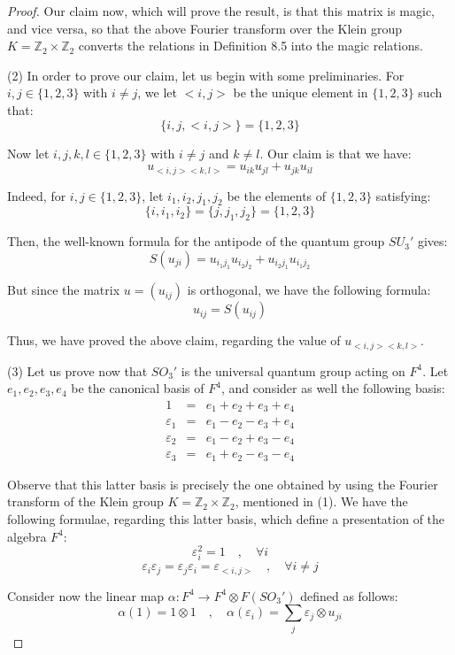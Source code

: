 \documentclass[12pt]{amsbook}
\begin{document}
\begin{proof}
Our claim now, which will prove the result, is that this matrix is magic, and vice versa, so that the above Fourier transform over the Klein group $K=\mathbb Z_2\times\mathbb Z_2$ converts the relations in Definition 8.5 into the magic relations.

\medskip

(2) In order to prove our claim, let us begin with some preliminaries. For $i,j\in\{1,2,3\}$
with $i\neq j$, we let $<i,j>$ be the unique  element in $\{1,2,3\}$ such that:
$$\{i,j,<i,j>\}=\{1,2,3\}$$

Now let $i,j,k,l \in \{1,2,3\}$ with $i\neq j$ and $k\neq l$. Our claim is that we have:
$$u_{<i,j><k,l>}=u_{ik}u_{jl}+u_{jk}u_{il}$$  

Indeed, for $i,j\in\{1,2,3\}$, let $i_1,i_2,j_1,j_2$ be the elements of $\{1,2,3\}$ satisfying:
$$\{i,i_1,i_2\}=\{j,j_1,j_2\}=\{1,2,3\} $$

Then, the well-known formula for the antipode of the quantum group $SU_3'$ gives:
$$S(u_{ji})=u_{i_1j_1}u_{i_2j_2}+u_{i_2j_1}u_{i_1j_2}$$

But since the matrix $u=(u_{ij})$ is orthogonal, we have the following formula:
$$u_{ij}=S(u_{ij})$$

Thus, we have proved the above claim, regarding the value of $u_{<i,j><k,l>}$.  

\medskip

(3) Let us prove now that $SO_3'$ is the universal quantum group acting on $F^4$. Let $e_1, e_2, e_3, e_4$ be the canonical basis of $F^4$, and consider as well the following basis:
\begin{eqnarray*}
1&=&e_1+e_2+e_3+e_4\\
\varepsilon_1&=&e_1-e_2-e_3+e_4\\
\varepsilon_2&=&e_1-e_2+e_3-e_4\\
\varepsilon_3&=&e_1+e_2-e_3-e_4
\end{eqnarray*}

Observe that this latter basis is precisely the one obtained by using the Fourier transform of the Klein group $K=\mathbb Z_2 \times\mathbb Z_2$, mentioned in (1). We have the following formulae, regarding this latter basis, which define a presentation of the algebra $F^4$:
$$\varepsilon_i^2=1\quad,\quad\forall i$$
$$\varepsilon_i\varepsilon_j=\varepsilon_j \varepsilon_i=\varepsilon_{<i, j>}\quad,\quad \forall i \neq j$$

Consider now the linear map $\alpha :F^4 \to F^4 \otimes F(SO_3')$ defined as follows:
$$\alpha(1)=1\otimes 1\quad,\quad \alpha(\varepsilon_i)=\sum_j\varepsilon_j\otimes u_{ji}$$


\end{proof}
\end{document}
